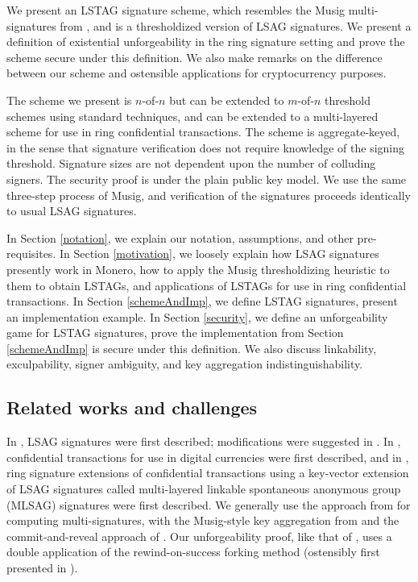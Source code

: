\documentclass{iacrtrans}
\theoremstyle{definition}
\numberwithin{theorem}{subsection}
\numberwithin{lemma}{theorem}
\begin{document}
We present an LSTAG signature scheme, which resembles the Musig multi-signatures from \cite{maxwell2018simple}, and is a thresholdized version of LSAG signatures. We present a definition of existential unforgeability in the ring signature setting and prove the scheme secure under this definition. We also make remarks on the difference between our scheme and ostensible applications for cryptocurrency purposes. 

The scheme we present is $n$-of-$n$ but can be extended to $m$-of-$n$ threshold schemes using standard techniques, and can be extended to a multi-layered scheme for use in ring confidential transactions. The scheme is aggregate-keyed, in the sense that signature verification does not require knowledge of the signing threshold. Signature sizes are not dependent upon the number of colluding signers. The security proof is under the plain public key model. We use the same three-step process of Musig, and verification of the signatures proceeds identically to usual LSAG signatures.

In Section \ref{notation}, we explain our notation, assumptions, and other pre-requisites. In Section \ref{motivation}, we loosely explain how LSAG signatures presently work in Monero, how to apply the Musig thresholdizing heuristic to them to obtain LSTAGs, and applications of LSTAGs for use in ring confidential transactions. In Section \ref{schemeAndImp}, we define LSTAG signatures, present an implementation example. In Section \ref{security}, we define an unforgeability game for LSTAG signatures, prove the implementation from Section \ref{schemeAndImp} is secure under this definition. We also discuss linkability, exculpability, signer ambiguity, and key aggregation indistinguishability. 


\subsection{Related works and challenges}

In \cite{liu2004linkable}, LSAG signatures were first described; modifications were suggested in \cite{backLSAG}.
In \cite{maxwell2015confidential}, confidential transactions for use in digital currencies were first described, and in \cite{noether2016ring}, ring signature extensions of confidential transactions using a key-vector extension of LSAG signatures called multi-layered linkable spontaneous anonymous group (MLSAG) signatures were first described. We generally use the approach from \cite{bellare2006multi} for computing multi-signatures, with the Musig-style key aggregation from \cite{qian2010non} and the commit-and-reveal approach of \cite{maxwell2018simple}. Our unforgeability proof, like that of \cite{maxwell2018simple}, uses a double application of the rewind-on-success forking method (ostensibly first presented in \cite{liu2004linkable}). 
\end{document}
